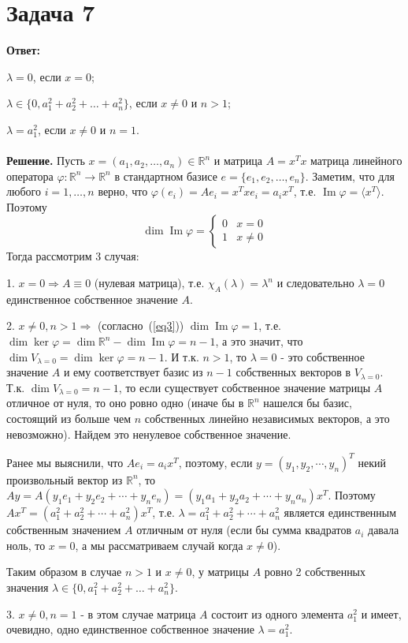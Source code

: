 \documentclass{article}
\DeclareMathOperator{\Ima}{Im}
\begin{document}
\section*{Задача 7}
{\bf Ответ:}
\par
$\lambda=0$, если $x=0$; 
\par
$\lambda\in\{0, a_1^2+a_2^2+\dots+a_n^2\}$, если $x\neq0$ и $n>1$; 
\par
$\lambda=a_1^2$, если $x\neq0$ и $n=1$.
\\
\\
{\bf Решение.} Пусть $x=(a_1,a_2,\dots,a_n)\in\mathbb{R}^n$ и матрица $A=x^Tx$ матрица линейного оператора $\varphi:\mathbb{R}^n\rightarrow\mathbb{R}^n$ в стандартном базисе $e=\{e_1,e_2,\dots,e_n\}$. Заметим, что для любого $i=1,\dots,n$ верно, что $\varphi(e_i)=Ae_i=x^Txe_i=a_ix^T$, т.е. $\Ima \varphi=\langle x^T\rangle$. Поэтому 
\begin{equation}
\label{eq3}
    \dim\Ima \varphi=
    \begin{cases}
        0 & x=0\\
        1 & x\neq0
    \end{cases}
\end{equation}
Тогда рассмотрим 3 случая: 
\par
1. $x=0\Rightarrow A\equiv0$ (нулевая матрица), т.е. $\chi_A(\lambda)=\lambda^n$ и следовательно $\lambda=0$ единственное собственное значение $A$.
\par
2. $x\neq0, n > 1\Rightarrow$ (согласно~(\ref{eq3})) $\dim \Ima \varphi=1$, т.е. $\dim \ker \varphi=\dim \mathbb{R}^n - \dim \Ima \varphi=n-1$, а это значит, что $\dim V_{\lambda = 0}=\dim \ker \varphi=n-1$. И т.к. $n>1$, то $\lambda=0$ - это собственное значение $A$ и ему соответствует базис из $n-1$ собственных векторов в $V_{\lambda=0}$. Т.к. $\dim V_{\lambda=0}= n-1$, то если существует собственное значение матрицы $A$ отличное от нуля, то оно ровно одно (иначе бы в $\mathbb{R}^n$ нашелся бы базис, состоящий из больше чем $n$ собственных линейно независимых векторов, а это невозможно). Найдем это ненулевое собственное значение. 
\par
Ранее мы выяснили, что $Ae_i=a_ix^T$, поэтому, если $y = (y_1, y_2,\cdots,y_n)^T$ некий произвольный вектор из $\mathbb{R}^n$, то $Ay=A(y_1e_1+y_2e_2+\cdots+y_ne_n)=(y_1a_1+y_2a_2+\cdots+y_na_n)x^T$. Поэтому $Ax^T=(a_1^2+a_2^2+\cdots+a_n^2)x^T$, т.е. $\lambda=a_1^2+a_2^2+\cdots+a_n^2$ является единственным собственным значением $A$ отличным от нуля (если бы сумма квадратов $a_i$ давала ноль, то $x=0$, а мы рассматриваем случай когда $x\neq0$).
\par
Таким образом в случае $n>1$ и $x\neq0$, у матрицы $A$ ровно 2 собственных значения $\lambda\in\{0,a_1^2+a_2^2+\dots+a_n^2\}$.   
\par
3. $x\neq0, n=1$ - в этом случае матрица $A$ состоит из одного элемента $a_1^2$ и имеет, очевидно, одно единственное собственное значение $\lambda=a_1^2$.
\end{document}
